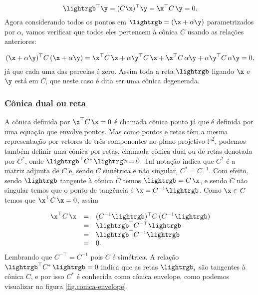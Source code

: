 \begin{equation*}
\lightrgb^\top\y=(C\x)^\top\y=\x^\top C\,\y=0.
\end{equation*}  
Agora considerando todos os pontos em $\lightrgb=(\x+\alpha\y)$ parametrizados por $\alpha$, vamos verificar que todos eles pertencem à cônica $C$ usando as relações anteriores:

\begin{equation*}
(\x+\alpha\y)^\top C\,(\x+\alpha\y)=\x^\top C\,\x+\alpha\y^\top C\,\x+\x^\top C\,\alpha\y+\alpha\y^\top C\,\alpha\y=0,
\end{equation*}
já que cada uma das parcelas é zero. Assim toda a reta $\lightrgb$ ligando $\x$ e $\y$ está em $C$, que neste caso é dita ser uma cônica degenerada.\\

\subsubsection{Cônica dual ou reta}\label{sec.conica-dual} 

A cônica definida por $\x^\top C\,\x=0$ é chamada cônica ponto já que é definida por uma equação que envolve pontos. Mas como pontos e retas têm a mesma representação por vetores de três componentes no plano projetivo $\mathbb{P}^2$, podemos também definir uma cônica por retas, chamada cônica dual ou de retas denotada por $C^*$, onde $\lightrgb^\top C^*\,\lightrgb=0$. Tal notação indica que $C^*$ é a matriz adjunta de $C$ e, sendo $C$ simétrica e não singular, $C^*=C^{-1}$. Com efeito, sendo $\lightrgb$ tangente à cônica $C$ temos $\lightrgb=C\,\x$, e sendo $C$ não singular temos que o ponto de tangência é $\x=C^{-1}\lightrgb$. Como $\x\in C$ temos que $\x^\top C\,\x=0$, assim

\begin{equation*}
\begin{array}{rcl}
\x^\top C\,\x&=&(C^{-1}\lightrgb)^\top C\,(
C^{-1}\lightrgb)\\
&=&\lightrgb^\top C^{-\top}\lightrgb\\
&=&\lightrgb^\top C^{-1}\lightrgb\\
&=&0.
\end{array}
\end{equation*}
Lembrando que $C^{-\top}=C^{-1}$ pois $C$ é simétrica. A relação $\lightrgb^\top C^*\,\lightrgb=0$ indica que as retas $\lightrgb_i$ são tangentes à cônica $C$, e por isso $C^*$ é conhecida como cônica envelope, como podemos visualizar na figura \ref{fig.conica-envelope}.

